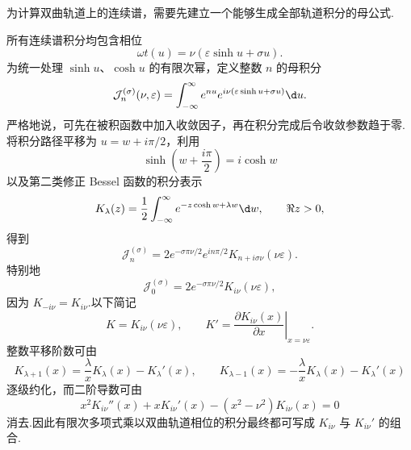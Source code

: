 为计算双曲轨道上的连续谱，需要先建立一个能够生成全部轨道积分的母公式.

所有连续谱积分均包含相位
\begin{equation}
 \omega t(u)=\nu\left(\varepsilon\sinh u+\sigma u\right).
\end{equation}
为统一处理 $\sinh u$、$\cosh u$ 的有限次幂，定义整数 $n$ 的母积分
\begin{equation}
 \mathcal J_n^{(\sigma)}(\nu,\varepsilon)
 =\int_{-\infty}^{\infty}
 e^{nu}e^{i\nu(\varepsilon\sinh u+\sigma u)}\d u.
 \label{eq:hyperbolic-master-integral-definition}
\end{equation}
严格地说，可先在被积函数中加入收敛因子，再在积分完成后令收敛参数趋于零.将积分路径平移为 $u=w+i\pi/2$，利用
\begin{equation}
 \sinh\left(w+\frac{i\pi}{2}\right)=i\cosh w
\end{equation}
以及第二类修正 Bessel 函数的积分表示
\begin{equation}
 K_\lambda(z)=\frac{1}{2}\int_{-\infty}^{\infty}
 e^{-z\cosh w+\lambda w}\d w,
 \qquad \Re z>0,
 \label{eq:K-integral-representation-spectrum}
\end{equation}
得到
\begin{equation}
 \mathcal J_n^{(\sigma)}
 =2e^{-\sigma\pi\nu/2}e^{in\pi/2}
 K_{n+i\sigma\nu}(\nu\varepsilon).
 \label{eq:master-K-integral}
\end{equation}
特别地
\begin{equation}
 \mathcal J_0^{(\sigma)}
 =2e^{-\sigma\pi\nu/2}K_{i\nu}(\nu\varepsilon),
 \label{eq:basic-K-integral}
\end{equation}
因为 $K_{-i\nu}=K_{i\nu}$.以下简记
\begin{equation}
 K=K_{i\nu}(\nu\varepsilon),
 \qquad
 K'=\left.\frac{\partial K_{i\nu}(x)}{\partial x}\right|_{x=\nu\varepsilon}.
 \label{eq:K-short-notation-spectrum}
\end{equation}
整数平移阶数可由
\begin{equation}
 K_{\lambda+1}(x)=\frac{\lambda}{x}K_\lambda(x)-K_\lambda'(x),
 \qquad
 K_{\lambda-1}(x)=-\frac{\lambda}{x}K_\lambda(x)-K_\lambda'(x)
 \label{eq:K-recurrences-spectrum}
\end{equation}
逐级约化，而二阶导数可由
\begin{equation}
 x^2K_{i\nu}''(x)+xK_{i\nu}'(x)-(x^2-\nu^2)K_{i\nu}(x)=0
 \label{eq:K-imaginary-order-ODE}
\end{equation}
消去.因此有限次多项式乘以双曲轨道相位的积分最终都可写成 $K_{i\nu}$ 与 $K_{i\nu}'$ 的组合.

